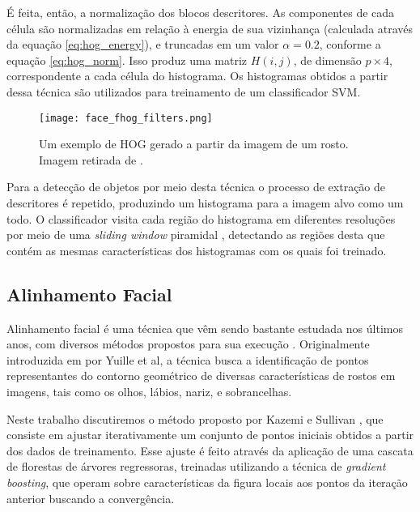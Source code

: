 É feita, então, a normalização dos blocos descritores.
As componentes de cada célula são normalizadas em relação à energia de sua vizinhança (calculada através da equação \ref{eq:hog_energy}), e truncadas em um valor $\alpha=0.2$, conforme a equação \ref{eq:hog_norm}.
Isso produz uma matriz $H(i,j)$, de dimensão $p\times4$, correspondente a cada célula do histograma.
Os histogramas obtidos a partir dessa técnica são utilizados para treinamento de um classificador SVM.

\begin{figure}[ht]
    \centering
    \texttt{[image: face\_fhog\_filters.png]}
    \caption{Um exemplo de HOG gerado a partir da imagem de um rosto. Imagem retirada de \cite{kingDlib18Released}.}
    \label{fig:dlib_hog}
\end{figure}

Para a detecção de objetos por meio desta técnica o processo de extração de descritores é repetido, produzindo um histograma para a imagem alvo como um todo.
O classificador visita cada região do histograma em diferentes resoluções por meio de uma \textit{sliding window} piramidal \cite{dalalHistogramsOrientedGradients2005}, detectando as regiões desta que contém as mesmas características dos histogramas com os quais foi treinado.

\subsection{Alinhamento Facial}
\label{sec:faciallm}

Alinhamento facial é uma técnica que vêm sendo bastante estudada nos últimos anos, com diversos métodos propostos para sua execução \cite{caoFaceAlignmentExplicit2014, liangFaceAlignmentComponentBased2008, dantoneRealtimeFacialFeature2012, xiangxinzhuFaceDetectionPose2012}.
Originalmente introduzida em \cite{yuilleFeatureExtractionFaces1992} por Yuille et al, a técnica busca a identificação de pontos representantes do contorno geométrico de diversas características de rostos em imagens, tais como os olhos, lábios, nariz, e sobrancelhas.

Neste trabalho discutiremos o método proposto por Kazemi e Sullivan \cite{kazemiOneMillisecondFace2014}, que consiste em ajustar iterativamente um conjunto de pontos iniciais obtidos a partir dos dados de treinamento.
Esse ajuste é feito através da aplicação de uma cascata de florestas de árvores regressoras, treinadas utilizando a técnica de \textit{gradient boosting}, que operam sobre características da figura locais aos pontos da iteração anterior buscando a convergência.

